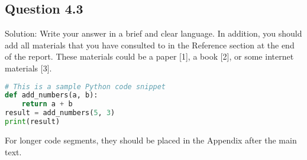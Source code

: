 \documentclass[12pt]{article}
\begin{document}
\subsection{Question 4.3}
Solution: Write your answer in a brief and clear language. In addition, you should add all materials that you have consulted to in the Reference section at the end of the report. These materials could be a paper [1], a book [2], or some internet materials [3].

\newpage


\begin{center}
\begin{lstlisting}[language=Python]
# This is a sample Python code snippet
def add_numbers(a, b):
    return a + b
result = add_numbers(5, 3)
print(result)
\end{lstlisting}
\end{center}

For longer code segments, they should be placed in the Appendix after the main text.

\end{document}
